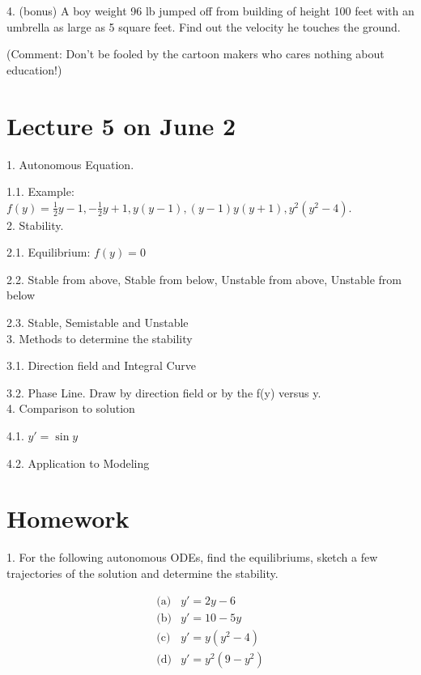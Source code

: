 \documentclass[11pt]{article}
\begin{document}
4. (bonus) A boy weight 96 lb jumped off from building of height 100 feet with an umbrella as large as 5 square feet. Find out the velocity he touches the ground. 

(Comment: Don't be fooled by the cartoon makers who cares nothing about education!)



\newpage

\section{Lecture 5 on June 2}

1. Autonomous Equation. 

1.1. Example: $f(y) = \frac 1 2 y  - 1, -\frac 1 2 y + 1, y(y-1), (y-1)y(y+1), y^2(y^2 - 4)$. \\

2. Stability.

2.1. Equilibrium: $f(y)=0$

2.2. Stable from above, Stable from below, Unstable from above, Unstable from below

2.3. Stable, Semistable and Unstable\\

3. Methods to determine the stability

3.1. Direction field and Integral Curve

3.2. Phase Line. Draw by direction field or by the f(y) versus y. \\

4. Comparison to solution

4.1. $y' = \sin y$

4.2. Application to Modeling 

\newpage

\section*{Homework}

1. For the following autonomous ODEs, find the equilibriums, sketch a few trajectories of the solution and determine the stability.

$$\begin{aligned}
\text{(a)} & y' = 2y-6\\
\text{(b)} & y' = 10-5y\\
\text{(c)} & y' = y(y^2 - 4)\\
\text{(d)} & y' = y^2(9-y^2)\\
\end{aligned}$$
\end{document}
